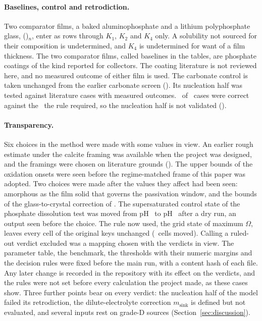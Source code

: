 \paragraph*{Baselines, control and retrodiction.}
Two comparator films, a baked aluminophosphate and a lithium polyphosphate glass, ()$_n$, enter as rows through $K_1$, $K_2$ and $K_4$ only. %
A solubility not sourced for their composition is undetermined, and $K_4$ is undetermined for want of a film thickness. %
The two comparator films, called baselines in the tables, are phosphate coatings of the kind reported for collectors. %
The coating literature is not reviewed here, and no measured outcome of either film is used. %
The carbonate control is taken unchanged from the earlier carbonate screen (). %
Its nucleation half was tested against literature cases with measured outcomes. %
\NumRetroCorrect\ of \NumRetroUsableCases\ cases were correct against the \NumRetroPassCount\ the rule required, so the nucleation half is not validated (). %

\paragraph*{Transparency.}
Six choices in the method were made with some values in view. %
An earlier rough estimate under the calcite framing was available when the project was designed, and the framings were chosen on literature grounds (). %
The upper bounds of the oxidation onsets were seen before the regime-matched frame of this paper was adopted. %
Two choices were made after the values they affect had been seen: amorphous  as the film solid that governs the passivation window, and the bounds of the glass-to-crystal correction of . %
The supersaturated control state of the phosphate dissolution test was moved from pH \NumCtlPhFrom\ to pH \NumCtlPhTo\ after a dry run, an output seen before the choice. %
The rule now used, the grid state of maximum $\Omega$, leaves every cell of the original keys unchanged (\NumCtlCellsMoved\ cells moved). %
Calling a ruled-out verdict excluded was a mapping chosen with the verdicts in view. %
The parameter table, the benchmark, the thresholds with their numeric margins and the decision rules were fixed before the main run, with a content hash of each file. %
Any later change is recorded in the repository with its effect on the verdicts, and the rules were not set before every calculation the project made, as these cases show. %
Three further points bear on every verdict: the nucleation half of the model failed its retrodiction, the dilute-electrolyte correction $m_\mathrm{sink}$ is defined but not evaluated, and several inputs rest on grade-D sources (Section~\ref{sec:discussion}). %

